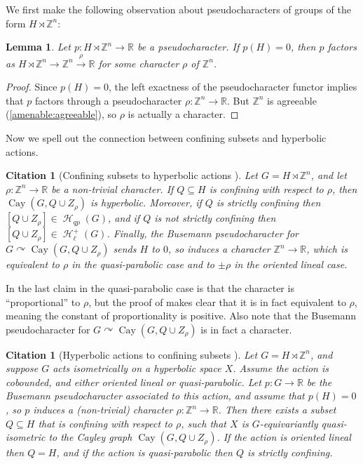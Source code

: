 \documentclass[reqno,12pt]{amsart}\setcounter{tocdepth}{1}
\newtheorem{lemma}[theorem]{Lemma}
\newtheorem{cit}[theorem]{Citation}
\theoremstyle{definition}
\newcommand{\Z}{\mathbb{Z}}
\newcommand{\R}{\mathbb{R}}
\DeclareMathOperator{\Hyp}{\mathcal{H}}
\DeclareMathOperator{\Cay}{Cay}
\numberwithin{equation}{section}
\begin{document}
We first make the following observation about pseudocharacters of groups of the form $H \rtimes \Z^n$:

\begin{lemma}
\label{lem:factor}
Let $p \colon H \rtimes \Z^n \to \R$ be a pseudocharacter. If $p(H) = 0$, then $p$ factors as $H \rtimes \Z^n \to \Z^n \xrightarrow{\rho} \R$ for some character $\rho$ of $\Z^n$.
\end{lemma}

\begin{proof}
Since $p(H) = 0$, the left exactness of the pseudocharacter functor \cite[Remark 2.90]{scl} implies that $p$ factors through a pseudocharacter $\rho \colon \Z^n \to \R$. But $\Z^n$ is agreeable (\cref{amenable:agreeable}), so $\rho$ is actually a character.
\end{proof}

Now we spell out the connection between confining subsets and hyperbolic actions.

\begin{cit}[Confining subsets to hyperbolic actions {\cite[Theorem~1.1]{confining}}]\label{cit:confining_to_action}
Let $G=H\rtimes \Z^n$, and let $\rho\colon \Z^n\to \R$ be a non-trivial character. If $Q\subseteq H$ is confining with respect to $\rho$, then $\Cay(G,Q\cup Z_\rho)$ is hyperbolic. Moreover, if $Q$ is strictly confining then $[Q\cup Z_\rho]\in \Hyp_{qp}(G)$, and if $Q$ is not strictly confining then $[Q\cup Z_\rho]\in \Hyp_\ell^+(G)$. Finally, the Busemann pseudocharacter for $G\curvearrowright \Cay(G,Q\cup Z_\rho)$ sends $H$ to $0$, so induces a character $\Z^n\to\R$, which is equivalent to $\rho$ in the quasi-parabolic case and to $\pm\rho$ in the oriented lineal case.
\end{cit}

In \cite[Theorem~1.1]{confining} the last claim in the quasi-parabolic case is that the character is ``proportional'' to $\rho$, but the proof of \cite[Lemma~1.1]{confining} makes clear that it is in fact equivalent to $\rho$, meaning the constant of proportionality is positive. Also note that the Busemann pseudocharacter for $G\curvearrowright \Cay(G,Q\cup Z_\rho)$ is in fact a character.

\begin{cit}[Hyperbolic actions to confining subsets {\cite[Theorem~3.17]{confining}}]
\label{cit:action_to_confining}
Let $G=H\rtimes \Z^n$, and suppose $G$ acts isometrically on a hyperbolic space $X$. Assume the action is cobounded, and either oriented lineal or quasi-parabolic. Let $p\colon G\to\R$ be the Busemann pseudocharacter associated to this action, and assume that $p(H)=0$, so $p$ induces a (non-trivial) character $\rho\colon \Z^n\to\R$. Then there exists a subset $Q\subseteq H$ that is confining with respect to $\rho$, such that $X$ is $G$-equivariantly quasi-isometric to the Cayley graph $\Cay(G,Q\cup Z_\rho)$. If the action is oriented lineal then $Q=H$, and if the action is quasi-parabolic then $Q$ is strictly confining.
\end{cit}
\end{document}
